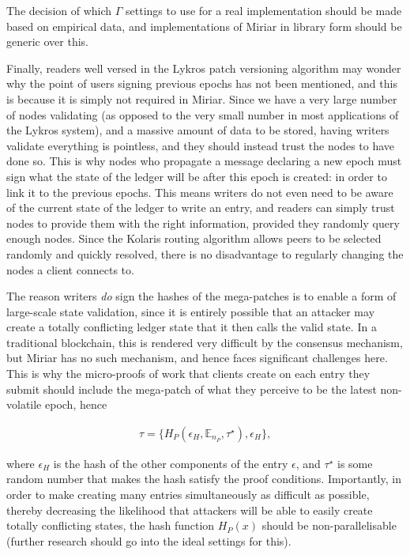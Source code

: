\documentclass{extreport}
\begin{document}
The decision of which \(\Gamma\) settings to use for a real implementation should be made based on empirical data, and implementations of Miriar in library form should be generic over this.

Finally, readers well versed in the Lykros patch versioning algorithm may wonder why the point of users signing previous epochs has not been mentioned, and this is because it is simply not required in Miriar. Since we have a very large number of nodes validating (as opposed to the very small number in most applications of the Lykros system), and a massive amount of data to be stored, having writers validate everything is pointless, and they should instead trust the nodes to have done so. This is why nodes who propagate a message declaring a new epoch must sign what the state of the ledger will be after this epoch is created: in order to link it to the previous epochs. This means writers do not even need to be aware of the current state of the ledger to write an entry, and readers can simply trust nodes to provide them with the right information, provided they randomly query enough nodes. Since the Kolaris routing algorithm allows peers to be selected randomly and quickly resolved, there is no disadvantage to regularly changing the nodes a client connects to.

The reason writers \emph{do} sign the hashes of the mega-patches is to enable a form of large-scale state validation, since it is entirely possible that an attacker may create a totally conflicting ledger state that it then calls the valid state. In a traditional blockchain, this is rendered very difficult by the consensus mechanism, but Miriar has no such mechanism, and hence faces significant challenges here. This is why the micro-proofs of work that clients create on each entry they submit should include the mega-patch of what they perceive to be the latest non-volatile epoch, hence

\begin{align*}
\tau = \{ H_P(\epsilon_H, \mathbb{E}_{n_P}, \tau^\star), \epsilon_H \}, \tag{3.4}
\end{align*}

where \(\epsilon_H\) is the hash of the other components of the entry \(\epsilon\), and \(\tau^\star\) is some random number that makes the hash satisfy the proof conditions. Importantly, in order to make creating many entries simultaneously as difficult as possible, thereby decreasing the likelihood that attackers will be able to easily create totally conflicting states, the hash function \(H_P(x)\) should be non-parallelisable (further research should go into the ideal settings for this).
\end{document}

